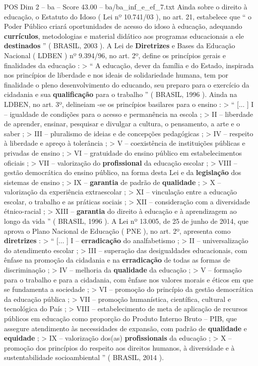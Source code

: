 \begin{textsample}{POS Dim 2 – ba – Score 43.00 – ba/ba\_inf\_e\_ef\_7.txt}
Ainda sobre o direito à educação, o Estatuto do Idoso ( Lei nº 10.741/03 ), no art. 21, estabelece que “ o Poder Público criará oportunidades de acesso do idoso à educação, adequando \textbf{currículos}, metodologias e material didático aos programas educacionais a ele \textbf{destinados} ” ( BRASIL, 2003 ).
A Lei de \textbf{Diretrizes} e Bases da Educação Nacional ( LDBEN ) nº 9.394/96, no art. 2º, define os princípios gerais e finalidades da educação : > “ A educação, dever da família e do Estado, inspirada nos princípios de liberdade e nos ideais de solidariedade humana, tem por finalidade o pleno desenvolvimento do educando, seu preparo para o exercício da cidadania e sua \textbf{qualificação} para o trabalho ” ( BRASIL, 1996 ).
Ainda na LDBEN, no art. 3º, delineiam -se os princípios basilares para o ensino : > “ [... ] I – igualdade de condições para o acesso e permanência na escola ; > II – liberdade de aprender, ensinar, pesquisar e divulgar a cultura, o pensamento, a arte e o saber ; > III – pluralismo de ideias e de concepções pedagógicas ; > IV – respeito à liberdade e apreço à tolerância ; > V – coexistência de instituições públicas e privadas de ensino ; > VI – gratuidade do ensino público em estabelecimentos oficiais ; > VII – valorização do \textbf{profissional} da educação escolar ; > VIII – gestão democrática do ensino público, na forma desta Lei e da \textbf{legislação} dos sistemas de ensino ; > IX – \textbf{garantia} de padrão de \textbf{qualidade} ; > X – valorização da experiência extraescolar ; > XI – vinculação entre a educação escolar, o trabalho e as práticas sociais ; > XII – consideração com a diversidade étnico-racial ; > XIII – \textbf{garantia} do direito à educação e à aprendizagem ao longo da vida ” ( BRASIL, 1996 ).
A Lei nº 13.005, de 25 de junho de 2014, que aprova o Plano Nacional de Educação ( PNE ), no art. 2º, apresenta como \textbf{diretrizes} : > “ [... ] I – \textbf{erradicação} do analfabetismo ; > II – universalização do atendimento escolar ; > III – superação das desigualdades educacionais, com ênfase na promoção da cidadania e na \textbf{erradicação} de todas as formas de discriminação ; > IV – melhoria da \textbf{qualidade} da educação ; > V – formação para o trabalho e para a cidadania, com ênfase nos valores morais e éticos em que se fundamenta a sociedade ; > VI – promoção do princípio da gestão democrática da educação pública ; > VII – promoção humanística, científica, cultural e tecnológica do País ; > VIII – estabelecimento de meta de aplicação de recursos públicos em educação como proporção do Produto Interno Bruto – PIB, que assegure atendimento às necessidades de expansão, com padrão de \textbf{qualidade} e \textbf{equidade} ; > IX – valorização dos(as) \textbf{profissionais} da educação ; > X – promoção dos princípios do respeito aos direitos humanos, à diversidade e à sustentabilidade socioambiental ” ( BRASIL, 2014 ).

\end{textsample}
